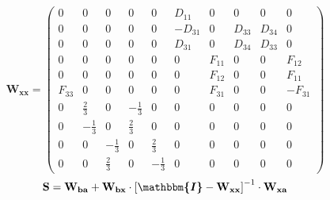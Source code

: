 \[ \mathbf{W_{xx}} = \left(\begin{smallmatrix} 0 & 0 & 0 & 0 & 0 &
D_{11} & 0 & 0 & 0 & 0 \\ 0 & 0 & 0 & 0 & 0 & -D_{31} & 0 & D_{33} &
D_{34} & 0 \\ 0 & 0 & 0 & 0 & 0 & D_{31} & 0 & D_{34} & D_{33} & 0 \\
0 & 0 & 0 & 0 & 0 & 0 & F_{11} & 0 & 0 & F_{12} \\ 0 & 0 & 0 & 0 & 0 &
0 & F_{12} & 0 & 0 & F_{11} \\ F_{33} & 0 & 0 & 0 & 0 & 0 & F_{31} & 0
& 0 & -F_{31} \\ 0 & \frac{2}{3} & 0 & -\frac{1}{3} & 0 & 0 & 0 & 0 &
0 & 0 \\ 0 & -\frac{1}{3} & 0 & \frac{2}{3} & 0 & 0 & 0 & 0 & 0 & 0 \\
0 & 0 & -\frac{1}{3} & 0 & \frac{2}{3} & 0 & 0 & 0 & 0 & 0 \\ 0 & 0 &
\frac{2}{3} & 0 & -\frac{1}{3} & 0 & 0 & 0 & 0 & 0
\end{smallmatrix}\right) \]
\[ \mathbf{S}=\mathbf{W_{ba}}+\mathbf{W_{bx}}\cdot\left[
\boldsymbol{\mathbbm{I}}
-\mathbf{W_{xx}}\right]^{-1}\cdot\mathbf{W_{xa}} \]
